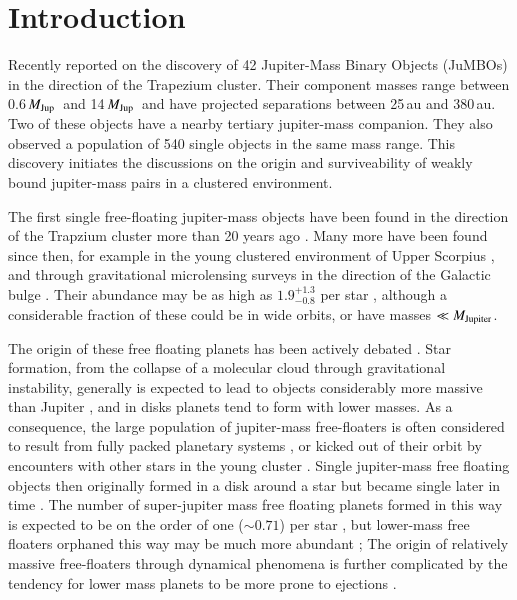 \documentclass[submission,phys]{lib/SciPost}
\newcommand{\MJup}{\mbox{${M}_{\rm Jup}$}}
\newcommand{\jumbos}{\mbox{JuMBOs}}
\begin{document}
\section{Introduction}

Recently \cite{2023arXiv231001231P} reported on the discovery of 42
Jupiter-Mass Binary Objects (\jumbos) in the direction of the
Trapezium cluster.  Their component masses range between 0.6\,\MJup\,
and 14\,\MJup\, and have projected separations between 25\,au and
380\,au.  Two of these objects have a nearby tertiary jupiter-mass
companion.  They also observed a population of 540 single objects in
the same mass range. This discovery initiates the discussions on the
origin and surviveability of weakly bound jupiter-mass pairs in a
clustered environment.

The first single free-floating jupiter-mass objects have been found in
the direction of the Trapzium cluster more than 20 years ago
\cite{2000Sci...290..103Z,2000MNRAS.314..858L,2000AGM....17..A11M}.
Many more have been found since then, for example in the young
clustered environment of Upper Scorpius \cite{2022NatAs...6...89M}, and
through gravitational microlensing surveys in the direction of the
Galactic bulge \cite{2011Natur.473..349S}.  Their abundance may be as
high as $1.9^{+1.3}_{-0.8}$ per star \cite{2011Natur.473..349S},
although a considerable fraction of these could be in wide orbits, or
have masses $\ll M_{\rm Jupiter}$.


The origin of these free floating planets has been actively debated
\cite{2023Ap&SS.368...17M}. Star formation, from the collapse of a
molecular cloud through gravitational instability, generally is
expected to lead to objects considerably more massive than Jupiter
\cite{1976MNRAS.176..367L,2005A&A...430.1059B}, and in disks planets
tend to form with lower masses. As a consequence, the large population
of jupiter-mass free-floaters is often considered to result from fully
packed planetary systems \cite{2023arXiv231015603C}, or kicked out of
their orbit by encounters with other stars in the young cluster
\cite{2019A&A...624A.120V}. Single jupiter-mass free floating objects
then originally formed in a disk around a star but became single later
in time
\cite{1996Sci...274..954R,2015MNRAS.453.2759Z,2002ApJ...565.1251H,2017MNRAS.470.4337C,
  2019MNRAS.489.2280F,2019A&A...624A.120V}.  The number of
super-jupiter mass free floating planets formed in this way is
expected to be on the order of one ($\sim 0.71$) per star
\cite{2019A&A...624A.120V}, but lower-mass free floaters orphaned this
way may be much more abundant \cite{2002ApJ...565.1251H}; The origin
of relatively massive free-floaters through dynamical phenomena is
further complicated by the tendency for lower mass planets to be more
prone to ejections
\cite{2001Icar..150..303F,2013MNRAS.433..867H,2019MNRAS.489.2280F,2020MNRAS.497.1807S}.
\end{document}
